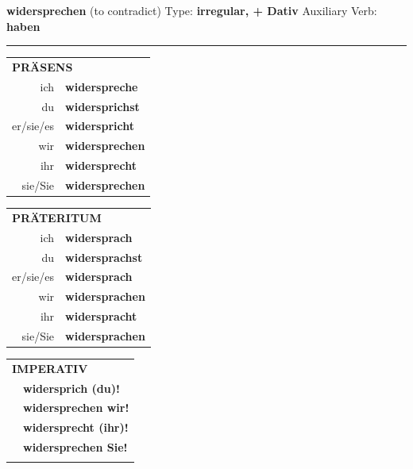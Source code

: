 \documentclass[10pt,a4paper]{revtex4-2}
\begin{document}
\begin{verbbox-dat}
    {\Large \bf widersprechen} (to contradict) \hfill Type: \textbf{irregular, + Dativ} \hfill Auxiliary Verb: \textbf{haben} 
    
     \vspace{5pt}

    \hrule
    
    \vspace{5pt}

  \begin{tabular}{rl}
     \multicolumn{2}{l}{\textbf{PRÄSENS} }\\
    ich & \textbf{widerspreche}\\
    du & \textbf{widersprichst}\\
    er/sie/es & \textbf{widerspricht}\\
    wir & \textbf{widersprechen}\\
    ihr & \textbf{widersprecht}\\
    sie/Sie & \textbf{widersprechen}\\
  \end{tabular}
  \hfill
     \begin{tabular}{rl}
    \multicolumn{2}{l}{\textbf{PRÄTERITUM} }\\
    ich & \textbf{widersprach}\\
    du & \textbf{widersprachst}\\
    er/sie/es & \textbf{widersprach}\\
    wir & \textbf{widersprachen}\\
    ihr & \textbf{widerspracht}\\
    sie/Sie & \textbf{widersprachen}\\
  \end{tabular}
  \hfill
  \begin{tabular}{rl}
     \multicolumn{2}{l}{\textbf{IMPERATIV} }\\
   & \textbf{widersprich (du)!}\\
   & \textbf{widersprechen wir!}\\
   & \textbf{widersprecht (ihr)!}\\
   & \textbf{widersprechen Sie!}\\
   & \vspace{10pt}
  \end{tabular}

    \vspace{10pt}


\end{verbbox-dat}
\end{document}

